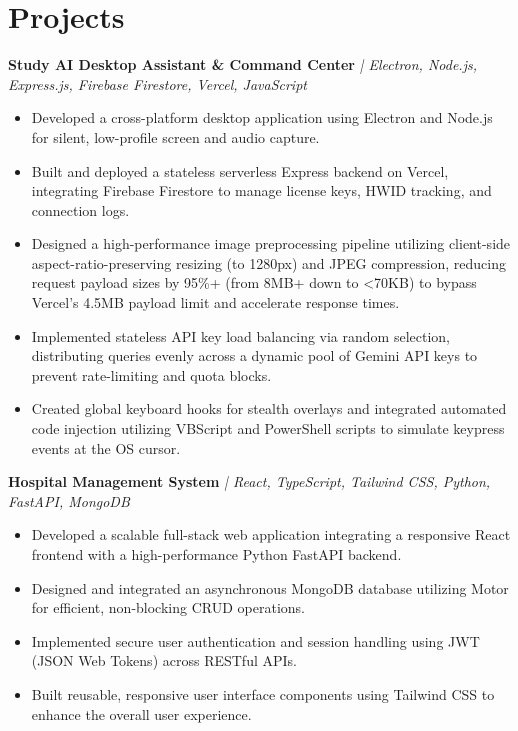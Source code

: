 \documentclass[letterpaper,11pt]{article}
\begin{document}
\section{Projects}

\noindent\textbf{Study AI Desktop Assistant \& Command Center} \href{https://github.com/sandeep2421-hub/study-ai-assistant}{\faGithub}
\textit{| Electron, Node.js, Express.js, Firebase Firestore, Vercel, JavaScript}
\begin{itemize}[leftmargin=*]
\item Developed a cross-platform desktop application using Electron and Node.js for silent, low-profile screen and audio capture.
\item Built and deployed a stateless serverless Express backend on Vercel, integrating Firebase Firestore to manage license keys, HWID tracking, and connection logs.
\item Designed a high-performance image preprocessing pipeline utilizing client-side aspect-ratio-preserving resizing (to 1280px) and JPEG compression, reducing request payload sizes by 95\%+ (from 8MB+ down to <70KB) to bypass Vercel's 4.5MB payload limit and accelerate response times.
\item Implemented stateless API key load balancing via random selection, distributing queries evenly across a dynamic pool of Gemini API keys to prevent rate-limiting and quota blocks.
\item Created global keyboard hooks for stealth overlays and integrated automated code injection utilizing VBScript and PowerShell scripts to simulate keypress events at the OS cursor.
\end{itemize}

\vspace{2pt} %
\noindent\textbf{Hospital Management System} \href{https://github.com/sandeep2421-hub/dsa-project-hospital-website}{\faGithub}
\textit{| React, TypeScript, Tailwind CSS, Python, FastAPI, MongoDB}
\begin{itemize}[leftmargin=*]
\item Developed a scalable full-stack web application integrating a responsive React frontend with a high-performance Python FastAPI backend.
\item Designed and integrated an asynchronous MongoDB database utilizing Motor for efficient, non-blocking CRUD operations.
\item Implemented secure user authentication and session handling using JWT (JSON Web Tokens) across RESTful APIs.
\item Built reusable, responsive user interface components using Tailwind CSS to enhance the overall user experience.
\end{itemize}
\end{document}
